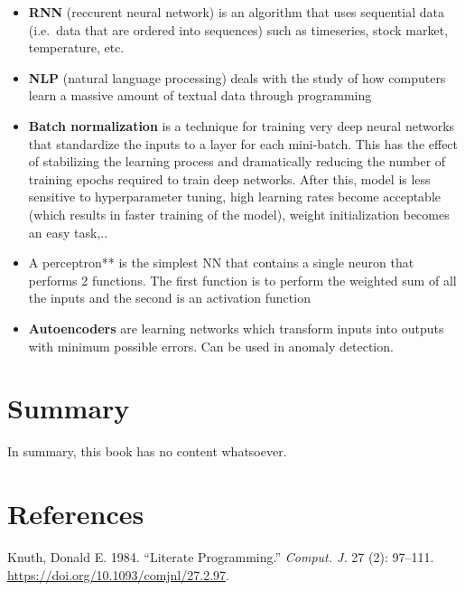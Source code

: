 \documentclass[
  letterpaper,
]{book}
\providecommand{\tightlist}{%
  \setlength{\itemsep}{0pt}\setlength{\parskip}{0pt}}\usepackage{longtable,booktabs,array}
\newlength{\cslhangindent}
\newlength{\cslentryspacingunit} %
\newenvironment{CSLReferences}[2] %
 {%
  \setlength{\parindent}{0pt}
  \ifodd #1
  \let\oldpar\par
  \def\par{\hangindent=\cslhangindent\oldpar}
  \fi
  \setlength{\parskip}{#2\cslentryspacingunit}
 }%
 {}
\begin{document}
\begin{itemize}
\tightlist
\item
  \textbf{RNN} (reccurent neural network) is an algorithm that uses
  sequential data (i.e.~data that are ordered into sequences) such as
  timeseries, stock market, temperature, etc.
\item
  \textbf{NLP} (natural language processing) deals with the study of how
  computers learn a massive amount of textual data through programming
\item
  \textbf{Batch normalization} is a technique for training very deep
  neural networks that standardize the inputs to a layer for each
  mini-batch. This has the effect of stabilizing the learning process
  and dramatically reducing the number of training epochs required to
  train deep networks. After this, model is less sensitive to
  hyperparameter tuning, high learning rates become acceptable (which
  results in faster training of the model), weight initialization
  becomes an easy task,..
\item
  A perceptron** is the simplest NN that contains a single neuron that
  performs 2 functions. The first function is to perform the weighted
  sum of all the inputs and the second is an activation function
\item
  \textbf{Autoencoders} are learning networks which transform inputs
  into outputs with minimum possible errors. Can be used in anomaly
  detection.
\end{itemize}


\hypertarget{summary}{%
\chapter*{Summary}\label{summary}}


In summary, this book has no content whatsoever.


\hypertarget{references}{%
\chapter*{References}\label{references}}


\hypertarget{refs}{}
\begin{CSLReferences}{1}{0}
\leavevmode{}%
Knuth, Donald E. 1984. {``Literate Programming.''} \emph{Comput. J.} 27
(2): 97--111. \url{https://doi.org/10.1093/comjnl/27.2.97}.

\end{CSLReferences}


\backmatter
\end{document}
